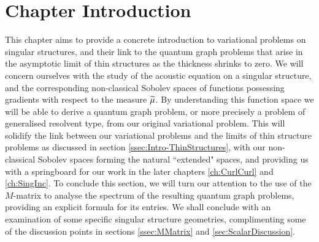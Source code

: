 \section{Chapter Introduction} \label{sec:ScalarEqnChapterIntro}
This chapter aims to provide a concrete introduction to variational problems on singular structures, and their link to the quantum graph problems that arise in the asymptotic limit of thin structures as the thickness shrinks to zero.
We will concern ourselves with the study of the acoustic equation on a singular structure, and the corresponding non-classical Sobolev spaces of functions possessing gradients with respect to the measure $\widetilde{\mu}$.
By understanding this function space we will be able to derive a quantum graph problem, or more precisely a problem of generalised resolvent type, from our original variational problem.
This will solidify the link between our variational problems and the limits of thin structure problems as discussed in section \ref{ssec:Intro-ThinStructures}, with our non-classical Sobolev spaces forming the natural ``extended" spaces, and providing us with a springboard for our work in the later chapters \ref{ch:CurlCurl} and \ref{ch:SingInc}.
To conclude this section, we will turn our attention to the use of the $M$-matrix to analyse the spectrum of the resulting quantum graph problems, providing an explicit formula for its entries.
We shall conclude with an examination of some specific singular structure geometries, complimenting some of the discussion points in sections \ref{ssec:MMatrix} and \ref{sec:ScalarDiscussion}.

